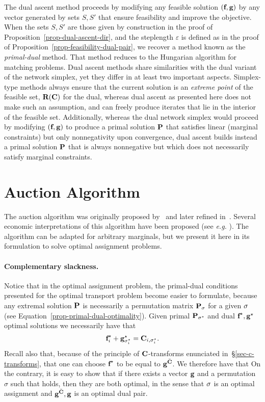The dual ascent method proceeds by modifying any feasible solution $(\fD,\gD)$ by any vector generated by sets $S,S'$ that ensure feasibility and improve the objective. When the sets $S,S'$ are those given by construction in the proof of Proposition~\ref{prop-dual-ascent-dir}, and the steplength $\varepsilon$ is defined as in the proof of Proposition~\ref{prop-feasibility-dual-pair}, we recover a method known as the \emph{primal-dual} method. That method reduces to the Hungarian algorithm for matching problems. Dual ascent methods share similarities with the dual variant of the network simplex, yet they differ in at least two important aspects. Simplex-type methods always ensure that the current solution is an \emph{extreme point} of the feasible set, $\PotentialsD(\C)$ for the dual, whereas dual ascent as presented here does not make such an assumption, and can freely produce iterates that lie in the interior of the feasible set. Additionally, whereas the dual network simplex would proceed by modifying $(\fD,\gD)$ to produce a primal solution $\P$ that satisfies linear (marginal constraints) but only nonnegativity upon convergence, dual ascent builds instead a primal solution $\P$ that is always nonnegative but which does not necessarily satisfy marginal constraints.

\section{Auction Algorithm}\label{s-auction}
The auction algorithm was originally proposed by~\citet{bertsekas1981new} and later refined in~\citep{bertsekas1988dual}. Several economic interpretations of this algorithm have been proposed (see \emph{e.g.} \citet{bertsekas1992auction}). The algorithm can be adapted for arbitrary marginals, but we present it here in its formulation to solve optimal assignment problems.

\paragraph{Complementary slackness.} Notice that in the optimal assignment problem, the primal-dual conditions presented for the optimal transport problem become easier to formulate, because any extremal solution $\P$ is  necessarily a permutation matrix $\P_\si$ for a given $\si$ (see Equation~\eqref{prop-primal-dual-optimality}). Given primal $\P_{\si^\star}$ and dual $\fD^\star,\gD^\star$ optimal solutions we necessarily have that
$$
\fD^\star_i + \gD^\star_{\si^\star_i} = \C_{i,{\si_i^\star}}.
$$
Recall also that, because of the principle of $\C$-transforms enunciated in~\S\ref{sec-c-transforms}, that one can choose $\fD^\star$ to be equal to $\gD^{\bar\C}$. We therefore have that
On the contrary, it is easy to show that if there exists a vector $\gD$ and a permutation $\sigma$ such that 
holds, then they are both optimal, in the sense that $\si$ is an optimal assignment and $\gD^{\bar\C},\gD$ is an optimal dual pair. 


